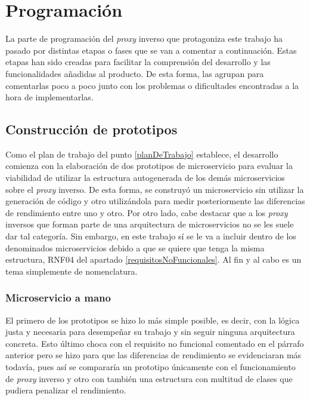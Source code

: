 \documentclass[11pt,spanish,listoffigures]{tfgetsinf}
\begin{document}

	\section{Programación} \label{programacion}

La parte de programación del \emph{proxy} inverso que protagoniza este trabajo ha pasado por distintas etapas o fases que se van a comentar a continuación. Estas etapas han sido creadas para facilitar la comprensión del desarrollo y las funcionalidades añadidas al producto. De esta forma, las agrupan para comentarlas poco a poco junto con los problemas o dificultades encontradas a la hora de implementarlas.


		\subsection{Construcción de prototipos}

Como el plan de trabajo del punto \ref{planDeTrabajo} establece, el desarrollo comienza con la elaboración de dos prototipos de microservicio para evaluar la viabilidad de utilizar la estructura autogenerada de los demás microservicios sobre el \emph{proxy} inverso. De esta forma, se construyó un microservicio sin utilizar la generación de código y otro utilizándola para medir posteriormente las diferencias de rendimiento entre uno y otro. Por otro lado, cabe destacar que a los \emph{proxy} inversos que forman parte de una arquitectura de microservicios no se les suele dar tal categoría. Sin embargo, en este trabajo sí se le va a incluir dentro de los denominados microservicios debido a que se quiere que tenga la misma estructura, RNF04 del apartado \ref{requisitosNoFuncionales}. Al fin y al cabo es un tema simplemente de nomenclatura.


			\subsubsection{Microservicio a mano}

El primero de los prototipos se hizo lo más simple posible, es decir, con la lógica justa y necesaria para desempeñar su trabajo y sin seguir ninguna arquitectura concreta. Esto último choca con el requisito no funcional comentado en el párrafo anterior pero se hizo para que las diferencias de rendimiento se evidenciaran más todavía, pues así se compararía un prototipo únicamente con el funcionamiento de \emph{proxy} inverso y otro con también una estructura con multitud de clases que pudiera penalizar el rendimiento.
\end{document}
